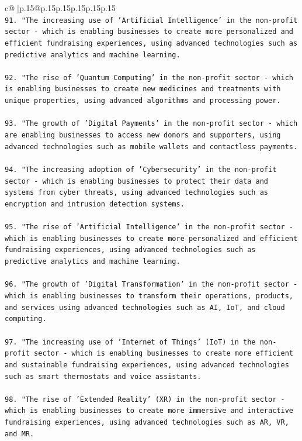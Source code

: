 \documentclass{article}
\begin{document}
{\begin{supertabular}{c@{$\;$}|p{.15\linewidth}@{}p{.15\linewidth}p{.15\linewidth}p{.15\linewidth}p{.15\linewidth}p{.15\linewidth}}
{{{\\ 
\texttt{91. "The increasing use of 'Artificial Intelligence' in the non{-}profit sector {-} which is enabling businesses to create more personalized and efficient fundraising experiences, using advanced technologies such as predictive analytics and machine learning.} \\
\\ 
\texttt{92. "The rise of 'Quantum Computing' in the non{-}profit sector {-} which is enabling businesses to create new medicines and treatments with unique properties, using advanced algorithms and processing power.} \\
\\ 
\texttt{93. "The growth of 'Digital Payments' in the non{-}profit sector {-} which are enabling businesses to access new donors and supporters, using advanced technologies such as mobile wallets and contactless payments.} \\
\\ 
\texttt{94. "The increasing adoption of 'Cybersecurity' in the non{-}profit sector {-} which is enabling businesses to protect their data and systems from cyber threats, using advanced technologies such as encryption and intrusion detection systems.} \\
\\ 
\texttt{95. "The rise of 'Artificial Intelligence' in the non{-}profit sector {-} which is enabling businesses to create more personalized and efficient fundraising experiences, using advanced technologies such as predictive analytics and machine learning.} \\
\\ 
\texttt{96. "The growth of 'Digital Transformation' in the non{-}profit sector {-} which is enabling businesses to transform their operations, products, and services using advanced technologies such as AI, IoT, and cloud computing.} \\
\\ 
\texttt{97. "The increasing use of 'Internet of Things' (IoT) in the non{-}profit sector {-} which is enabling businesses to create more efficient and sustainable fundraising experiences, using advanced technologies such as smart thermostats and voice assistants.} \\
\\ 
\texttt{98. "The rise of 'Extended Reality' (XR) in the non{-}profit sector {-} which is enabling businesses to create more immersive and interactive fundraising experiences, using advanced technologies such as AR, VR, and MR.} \\
}}}
\end{supertabular}}
\end{document}
